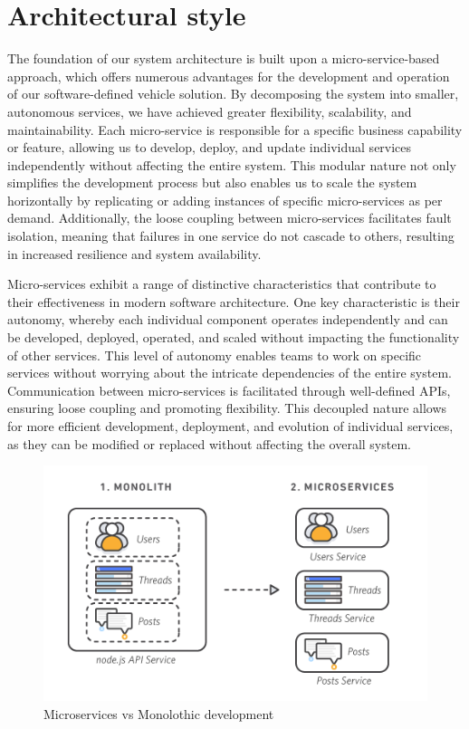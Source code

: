 \documentclass[
12pt,
oneside, 
onehalfspacing, 
nolistspacing, 
parskip, 
chapterinoneline, 
]{AASTCOMPUTER}
\begin{document}
\section{Architectural style}
The foundation of our system architecture is built upon a micro-service-based approach, which offers numerous advantages for the development and operation of our software-defined vehicle solution. By decomposing the system into smaller, autonomous services, we have achieved greater flexibility, scalability, and maintainability. Each micro-service is responsible for a specific business capability or feature, allowing us to develop, deploy, and update individual services independently without affecting the entire system. This modular nature not only simplifies the development process but also enables us to scale the system horizontally by replicating or adding instances of specific micro-services as per demand. Additionally, the loose coupling between micro-services facilitates fault isolation, meaning that failures in one service do not cascade to others, resulting in increased resilience and system availability.

Micro-services exhibit a range of distinctive characteristics that contribute to their effectiveness in modern software architecture. One key characteristic is their autonomy, whereby each individual component operates independently and can be developed, deployed, operated, and scaled without impacting the functionality of other services. This level of autonomy enables teams to work on specific services without worrying about the intricate dependencies of the entire system. Communication between micro-services is facilitated through well-defined APIs, ensuring loose coupling and promoting flexibility. This decoupled nature allows for more efficient development, deployment, and evolution of individual services, as they can be modified or replaced without affecting the overall system.


\begin{figure}[!ht]
	\centering
	\includegraphics[scale=0.5]{Figures/Architicture/micro-services.png}
  	\caption{Microservices vs Monolothic development}
  	\label{fig:Microservices vs Monolothic development}
\end{figure}
\end{document}
